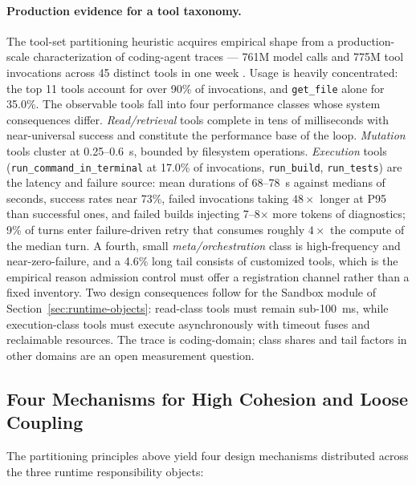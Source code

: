 \documentclass[11pt]{article}
\begin{document}
\paragraph{Production evidence for a tool taxonomy.}
The tool-set partitioning heuristic acquires empirical shape from a production-scale characterization of coding-agent traces --- 761M model calls and 775M tool invocations across 45 distinct tools in one week \cite{agenticcoding2026wild}. Usage is heavily concentrated: the top 11 tools account for over 90\% of invocations, and \texttt{get\_file} alone for 35.0\%. The observable tools fall into four performance classes whose system consequences differ. \textit{Read/retrieval} tools complete in tens of milliseconds with near-universal success and constitute the performance base of the loop. \textit{Mutation} tools cluster at 0.25--0.6~s, bounded by filesystem operations. \textit{Execution} tools (\texttt{run\_command\_in\_terminal} at 17.0\% of invocations, \texttt{run\_build}, \texttt{run\_tests}) are the latency and failure source: mean durations of 68--78~s against medians of seconds, success rates near 73\%, failed invocations taking $48\times$ longer at P95 than successful ones, and failed builds injecting 7--8$\times$ more tokens of diagnostics; 9\% of turns enter failure-driven retry that consumes roughly $4\times$ the compute of the median turn. A fourth, small \textit{meta/orchestration} class is high-frequency and near-zero-failure, and a 4.6\% long tail consists of customized tools, which is the empirical reason admission control must offer a registration channel rather than a fixed inventory. Two design consequences follow for the Sandbox module of Section~\ref{sec:runtime-objects}: read-class tools must remain sub-100~ms, while execution-class tools must execute asynchronously with timeout fuses and reclaimable resources. The trace is coding-domain; class shares and tail factors in other domains are an open measurement question.

\subsection{Four Mechanisms for High Cohesion and Loose Coupling}

The partitioning principles above yield four design mechanisms distributed across the three runtime responsibility objects:
\end{document}
